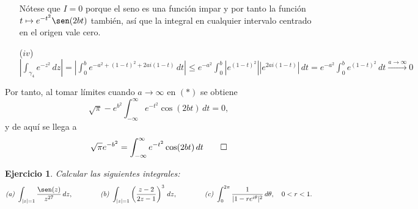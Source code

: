 \documentclass[11pt]{report}
\makeatletter
\renewenvironment{proof}[1][\proofname]{\par
  \pushQED{\qed}%
  \normalfont \topsep\z@skip %
  \trivlist
  \item[\hskip\labelsep
        \itshape
    #1\@addpunct{.}]\ignorespaces
}{%
  \popQED\endtrivlist\@endpefalse
}
\newtheorem{exercise}{Ejercicio}
\makeatother
\begin{document}
\begin{proof}
\begin{itemize}
    Nótese que $I = 0$ porque el seno es una función impar y por tanto la función $t \mapsto e^{-t^2}\sen(2bt)$ también, así que la integral en cualquier intervalo centrado en el origen vale cero.
    \item[($iv$)] $\displaystyle \left|\int_{\gamma_4} e^{-z^2} \, dz \right|= \left|\int_0^b e^{-a^2+(1-t)^2+2ai(1-t)} \, dt\right|\leq  e^{-a^2} \int_0^b |e^{(1-t)^2}||e^{2ai(1-t)}| \, dt =  e^{-a^2} \int_0^b e^{(1-t)^2} \, dt \xrightarrow[]{a \to \infty} 0$
\end{itemize}
Por tanto, al tomar límites cuando $a \to \infty$ en $(*)$ se obtiene
\[\sqrt{\pi}-e^{b^2}\int_{-\infty}^\infty e^{-t^2}\cos(2bt) \, dt =0,\]
y de aquí se llega a 
\[\sqrt{\pi}e^{-b^2}=\int_{-\infty}^\infty e^{-t^2}\cos(2bt) \, dt \qedhere\]

\end{proof}

\begin{exercise}
Calcular las siguientes integrales:
\[\textup{\emph{(a)}} \ \int_{|z| = 1}\frac{\sen(z)}{z^{27}} \, dz, \qquad \qquad \textup{\emph{(b)}} \ \int_{|z| = 1}\left(\frac{z-2}{2z-1}\right)^3 \, dz, \qquad \qquad \textup{\emph{(c)}} \ \int_{0}^{2\pi}\frac{1}{|1-re^{i\theta}|^2} \, d\theta, \quad 0<r<1.\]
\end{exercise}
\end{document}
